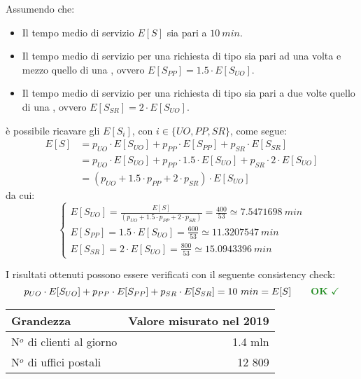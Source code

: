 Assumendo che:
\begin{itemize}
\item Il tempo medio di servizio $E[S]$ sia pari a $10\ min$.
\item Il tempo medio di servizio per una richiesta di tipo \pp{} sia pari ad una volta e mezzo quello di una \uo{}, ovvero $E[S_{PP}] = 1.5 \cdot E[S_{UO}]$.
\item Il tempo medio di servizio per una richiesta di tipo \sr{} sia pari a due volte quello di una \uo{}, ovvero $E[S_{SR}] = 2 \cdot E[S_{UO}]$.
\end{itemize}
è possibile ricavare gli $E[S_i]$, con $i \in \lbrace UO, PP, SR \rbrace$, come segue:
\begin{equation}
\begin{split}
E[S] &= p_{UO}\cdot E[S_{UO}] + p_{PP}\cdot E[S_{PP}] + p_{SR}\cdot E[S_{SR}] \\
&= p_{UO}\cdot E[S_{UO}] + p_{PP}\cdot 1.5\cdot E[S_{UO}] + p_{SR}\cdot 2\cdot E[S_{UO}] \\
&= (p_{UO} + 1.5\cdot p_{PP} + 2\cdot p_{SR}) \cdot E[S_{UO}]
\end{split}
\end{equation}
da cui:
\begin{equation}
\begin{cases}
E[S_{UO}] = \frac{E[S]}{(p_{UO} + 1.5\cdot p_{PP} + 2\cdot p_{SR})} = \frac{400}{53} \simeq 7.5471698\ min \\[1em]
E[S_{PP}] = 1.5\cdot E[S_{UO}] = \frac{600}{53} \simeq 11.3207547\ min \\[1em]
E[S_{SR}] = 2 \cdot E[S_{UO}] = \frac{800}{53} \simeq 15.0943396\ min
\end{cases}
\end{equation}

I risultati ottenuti possono essere verificati con il seguente consistency check:
\begin{equation}
p_{UO}\cdot E[S_{UO}] + p_{PP}\cdot E[S_{PP}] + p_{SR}\cdot E[S_{SR}] = 10\ min = E[S]\qquad \text{\color{forestgreen}\textbf{OK} \checkmark}
\end{equation}

\begin{table}[ht]
\centering
{\tablecolors
\begin{tabular}{| l | r |}
\hline
Grandezza & Valore misurato nel 2019 \\
\hline
N$^o$ di clienti al giorno & 1.4 mln \\
\hline
N$^o$ di uffici postali & 12 809 \\
\hline
\end{tabular}}
\label{table:modello-specifiche-2}
\end{table}


